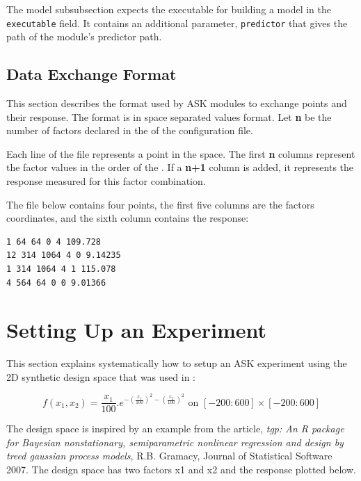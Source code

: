 The model subsubsection expects the executable for building a model in the \texttt{executable} field. It contains an additional parameter, 
\texttt{predictor} that gives the path of the module's predictor path.

\subsection{Data Exchange Format}

This section describes the format used by ASK modules to exchange points and their response.
The format is in space separated values format.
Let \textbf{n} be the number of factors declared in the  of the configuration file.

Each line of the file represents a point in the space. The first \textbf{n} columns represent the factor values in the order of the . If a \textbf{n+1} column is added, it represents the response measured for this factor combination.

The file below contains four points, the first five columns are the factors coordinates, and the sixth column contains the response:

\begin{verbatim}
1 64 64 0 4 109.728
12 314 1064 4 0 9.14235
1 314 1064 4 1 115.078
4 564 64 0 0 9.01366
\end{verbatim}

\section{Setting Up an Experiment}

This section explains systematically how to setup an ASK experiment using the 2D synthetic design space that was used in :


$$
f(x_1,x_2) = \frac{x_1}{100}.e^{-(\frac{x_1}{100})^2-(\frac{x_2}{100})^2} \textrm{ on } [-200:600] \times [-200:600]
$$

The design space is inspired by an example from the article, \emph{tgp: An R package for Bayesian nonstationary, semiparametric nonlinear regression and design by treed gaussian process models}, R.B. Gramacy, Journal of Statistical Software 2007. 
The design space has two factors x1 and x2 and the response plotted below.

